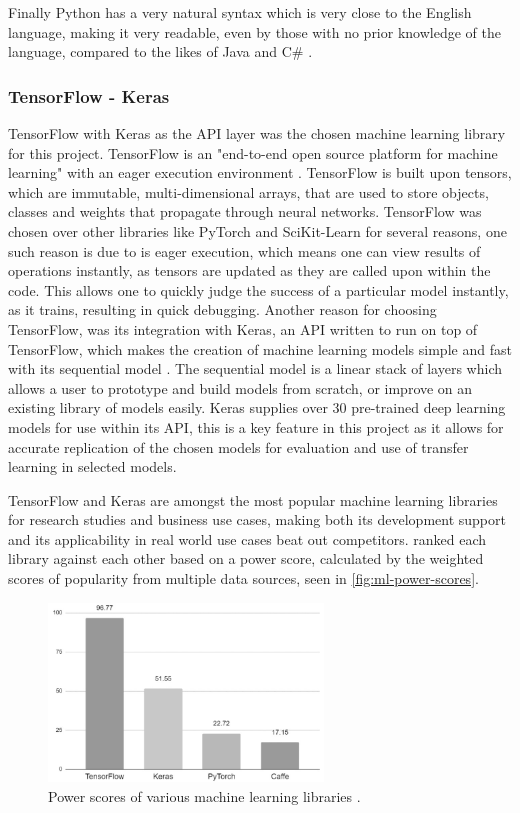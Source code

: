 Finally Python has a very natural syntax which is very close to the English language, making it very readable, even by those with no prior knowledge of the language, compared to the likes of Java and C\# \citep{srinath2017python}.

\subsubsection{TensorFlow - Keras}
TensorFlow with Keras as the API layer was the chosen machine learning library for this project. TensorFlow is an "end-to-end open source platform for machine learning" with an eager execution environment \citep{TensorFl5:online}. TensorFlow is built upon tensors, which are immutable, multi-dimensional arrays, that are used to store objects, classes and weights that propagate through neural networks. TensorFlow was chosen over other libraries like PyTorch and SciKit-Learn for several reasons, one such reason is due to is eager execution, which means one can view results of operations instantly, as tensors are updated as they are called upon within the code. This allows one to quickly judge the success of a particular model instantly, as it trains, resulting in quick debugging. Another reason for choosing TensorFlow, was its integration with Keras, an API written to run on top of TensorFlow, which makes the creation of machine learning models simple and fast with its sequential model \citep{AboutKer65:online}. The sequential model is a linear stack of layers which allows a user to prototype and build models from scratch, or improve on an existing library of models easily. Keras supplies over 30 pre-trained deep learning models for use within its API, this is a key feature in this project as it allows for accurate replication of the chosen models for evaluation and use of transfer learning in selected models.

TensorFlow and Keras are amongst the most popular machine learning libraries for research studies and business use cases, making both its development support and its applicability in real world use cases beat out competitors. \cite{hale2018deep} ranked each library against each other based on a power score, calculated by the weighted scores of popularity from multiple data sources, seen in \autoref{fig:ml-power-scores}. 

\begin{figure}[H]
    \centering
    \includegraphics[width=0.65\textwidth]{figures/ml-power-sources.jpg}
    \caption{Power scores of various machine learning libraries \citep{hale2018deep}.}
    \label{fig:ml-power-scores}
\end{figure}

